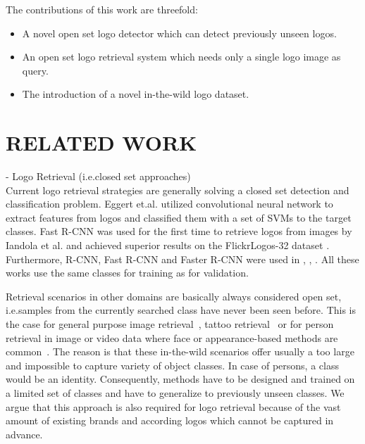 \documentclass[a4paper,twoside]{article}
\newcommand{\xie}{i.e.}
\newcommand{\xeg}{e.g.}
\begin{document}
The contributions of this work are threefold:
\begin{itemize}
\item A novel open set logo detector which can detect previously unseen logos.
\item An open set logo retrieval system which needs only a single logo image as query.
\item The introduction of a novel in-the-wild logo dataset.
\end{itemize}




\section{\uppercase{Related Work}}
\noindent- Logo Retrieval (\xie closed set approaches) \\
Current logo retrieval strategies are generally solving a closed set detection and classification problem. Eggert et.al. \cite{eggert2015} utilized convolutional neural network to extract features from logos and classified them with a set of SVMs to the target classes. Fast R-CNN \cite{girshick2015} was used for the first time to retrieve logos from images by Iandola et al. \cite{iandola2015} and achieved superior results on the FlickrLogos-32 dataset \cite{romberg2011}. Furthermore, R-CNN, Fast R-CNN and Faster R-CNN were used in \cite{bao2016}, \cite{oliveira2016}, \cite{qi2017}. All these works use the same classes for training as for validation.

Retrieval scenarios in other domains are basically always considered open set, \xie samples from the currently searched class have never been seen before.
This is the case for general purpose image retrieval~\cite{sivic2003}, tattoo retrieval~\cite{manger2012} or for person retrieval in image or video data where face or appearance-based methods are common~\cite{bauml2010,weber2011,herrmann2015b}. The reason is that these in-the-wild scenarios offer usually a too large and impossible to capture variety of object classes. In case of persons, a class would be an identity. Consequently, methods have to be designed and trained on a limited set of classes and have to generalize to previously unseen classes. We argue that this approach is also required for logo retrieval because of the vast amount of existing brands and according logos which cannot be captured in advance.
\end{document}
